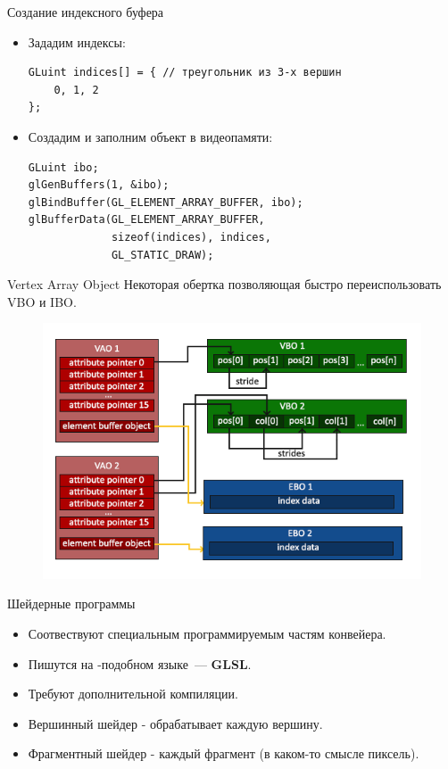 \documentclass[aspectration=1610,t]{beamer}
\begin{document}
\begin{frame}[fragile]{Создание индексного буфера}
    \begin{itemize}
        \item Зададим индексы:
            {\small \begin{lstlisting}
GLuint indices[] = { // треугольник из 3-х вершин
    0, 1, 2
};
            \end{lstlisting}}
        \item Создадим и заполним объект в видеопамяти:
            {\small \begin{lstlisting}
GLuint ibo;
glGenBuffers(1, &ibo);
glBindBuffer(GL_ELEMENT_ARRAY_BUFFER, ibo);
glBufferData(GL_ELEMENT_ARRAY_BUFFER,
             sizeof(indices), indices,
             GL_STATIC_DRAW);
            \end{lstlisting}}
    \end{itemize}
\end{frame}

\begin{frame}[fragile]{Vertex Array Object}
    Некоторая обертка позволяющая быстро переиспользовать VBO и IBO.
    \begin{figure}[htp]
        \centering
        \includegraphics[scale=0.40]{vao}
    \end{figure}
\end{frame}

\begin{frame}[fragile]{Шейдерные программы}
    \begin{itemize}
        \item Соотвествуют специальным программируемым частям конвейера.
        \item Пишутся на \langc-подобном языке~--- {\bf GLSL}.
        \item Требуют дополнительной компиляции.
        \item Вершинный шейдер - обрабатывает каждую вершину.
        \item Фрагментный шейдер - каждый фрагмент (в каком-то смысле пиксель).
    \end{itemize}
\end{frame}
\end{document}
